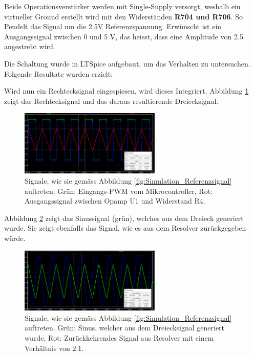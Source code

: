 Beide Operationsverstärker werden mit Single-Supply versorgt, weshalb ein virtueller Ground erstellt wird mit den Widerständen \textbf{R704 und R706}. So Pendelt das Signal um die 2.5V Referenzspannung. Erwünscht ist ein Ausgangssignal zwischen 0 und 5 V, das heisst, dass eine Amplitude von 2.5 angestrebt wird.

Die Schaltung wurde in LTSpice aufgebaut, um das Verhalten zu untersuchen. Folgende Resultate wurden erzielt:

Wird nun ein Rechtecksignal eingespiesen, wird dieses Integriert. Abbildung \ref{fig:Simulation_Rechteck_Dreieck} zeigt das Rechtecksignal und das daraus resultierende Dreiecksignal.

\begin{figure}[h!]
	\centering
	\includegraphics[width=0.6\textwidth]{graphics/Simulation_Signal_Viereck_Dreieck.png}
	\caption{Signale, wie sie gemäss Abbildung \ref{fig:Simulation_Referenzsignal} auftreten. Grün: Eingangs-PWM vom Mikrocontroller, Rot: Ausgangssignal zwischen Opamp U1 und Widerstand R4.}
	\label{fig:Simulation_Rechteck_Dreieck}
\end{figure}

Abbildung \ref{fig:Simulation_Dreieck_Sinus} zeigt das Sinussignal (grün), welches aus dem Dreieck generiert wurde. Sie zeigt ebenfalls das Signal, wie es aus dem Resolver zurückgegeben würde.

\begin{figure}[h!]
	\centering
	\includegraphics[width=0.6\textwidth]{graphics/Simulation_Signal_Sinus1_Sinus2.png}
	\caption{Signale, wie sie gemäss Abbildung \ref{fig:Simulation_Referenzsignal} auftreten. Grün: Sinus, welcher aus dem Dreiecksignal generiert wurde, Rot: Zurückkehrendes Signal aus Resolver mit einem Verhältnis von 2:1.}
	\label{fig:Simulation_Dreieck_Sinus}
\end{figure}

